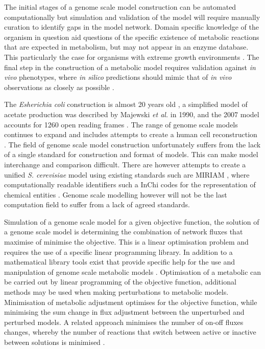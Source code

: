 The initial stages of a genome scale model construction can be automated computationally but simulation and validation of the model will require manually curation to identify gaps in the model network. Domain specific knowledge of the organism in question aid questions of the specific existence of metabolic reactions that are expected in metabolism, but may not appear in an enzyme database. This particularly the case for organisms with extreme growth environments \cite{sun2009}. The final step in the construction of a metabolic model requires validation against \emph{in vivo} phenotypes, where \emph{in silico} predictions should mimic that of \emph{in vivo} observations as closely as possible \cite{famili2003}.

The \emph{Esherichia coli} construction is almost 20 years old \cite{feist2008}, a simplified model of acetate production was described by Majewski \emph{et al.} in 1990, and the 2007 model accounts for 1260 open reading frames \cite{feist2007}. The range of genome scale models continues to expand and includes attempts to create a human cell reconstruction \cite{duarte2007}. The field of genome scale model construction unfortunately suffers from the lack of a single standard for construction and format of models. This can make model interchange and comparison difficult. There are however attempts to create a unified \emph{S. cerevisiae} model \cite{herrgard2008} using existing standards such are MIRIAM \cite{lenovere2005}, where computationally readable identifiers such a InChi codes for the representation of chemical entities \cite{coles2005}. Genome scale modelling however will not be the last computation field to suffer from a lack of agreed standards.

Simulation of a genome scale model for a given objective function, the solution of a genome scale model is determining the combination of network fluxes that maximise of minimise the objective. This is a linear optimisation problem and requires the use of a specific linear programming library. In addition to a mathematical library tools exist that provide specific help for the use and manipulation of genome scale metabolic models \cite{becker2007}. Optimisation of a metabolic can be carried out by linear programming of the objective function, additional methods may be used when making perturbations to metabolic models. Minimisation of metabolic adjustment \cite{segre2002,burgard2003} optimises for the objective function, while minimising the sum change in flux adjustment between the unperturbed and perturbed models. A related approach minimises the number of on-off fluxes changes, whereby the number of reactions that switch between active or inactive between solutions is minimised \cite{shlomi2005}.


